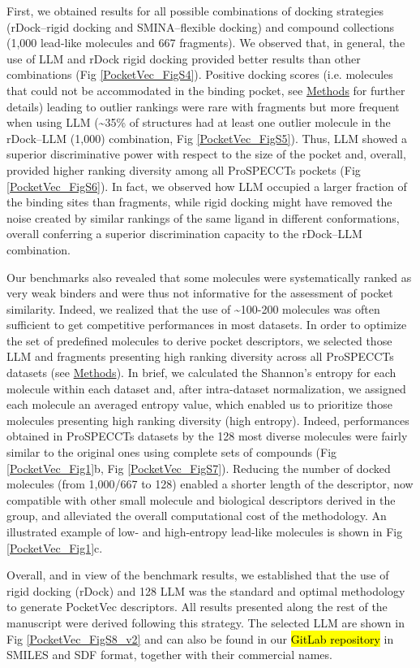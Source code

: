 First, we obtained results for all possible combinations of docking strategies (rDock--rigid docking and SMINA--flexible docking) and compound collections (1,000 lead-like molecules and 667 fragments). We observed that, in general, the use of LLM and rDock rigid docking provided better results than other combinations (Fig \ref{PocketVec_FigS4}). Positive docking scores (i.e. molecules that could not be accommodated in the binding pocket, see \hyperref[PocketVec_Methods]{Methods} for further details) leading to outlier rankings were rare with fragments but more frequent when using LLM (\textasciitilde35\% of structures had at least one outlier molecule in the rDock--LLM (1,000) combination, Fig \ref{PocketVec_FigS5}). Thus, LLM showed a superior discriminative power with respect to the size of the pocket and, overall, provided higher ranking diversity among all ProSPECCTs pockets (Fig \ref{PocketVec_FigS6}). In fact, we observed how LLM occupied a larger fraction of the binding sites than fragments, while rigid docking might have removed the noise created by similar rankings of the same ligand in different conformations, overall conferring a superior discrimination capacity to the rDock--LLM combination.

Our benchmarks also revealed that some molecules were systematically ranked as very weak binders and were thus not informative for the assessment of pocket similarity. Indeed, we realized that the use of \textasciitilde100-200 molecules was often sufficient to get competitive performances in most datasets. In order to optimize the set of predefined molecules to derive pocket descriptors, we selected those LLM and fragments presenting high ranking diversity across all ProSPECCTs datasets (see \hyperref[PocketVec_Methods]{Methods}). In brief, we calculated the Shannon’s entropy for each molecule within each dataset and, after intra-dataset normalization, we assigned each molecule an averaged entropy value, which enabled us to prioritize those molecules presenting high ranking diversity (high entropy). Indeed, performances obtained in ProSPECCTs datasets by the 128 most diverse molecules were fairly similar to the original ones using complete sets of compounds (Fig \ref{PocketVec_Fig1}b, Fig \ref{PocketVec_FigS7}). Reducing the number of docked molecules (from 1,000/667 to 128) enabled a shorter length of the descriptor, now compatible with other small molecule and biological descriptors derived in the group\cite{fernandez-torras_integrating_2022, duran-frigola_extending_2020, bertoni_bioactivity_2021}, and alleviated the overall computational cost of the methodology. An illustrated example of low- and high-entropy lead-like molecules is shown in Fig \ref{PocketVec_Fig1}c.

Overall, and in view of the benchmark results, we established that the use of rigid docking (rDock) and 128 LLM was the standard and optimal methodology to generate PocketVec descriptors. All results presented along the rest of the manuscript were derived following this strategy. The selected LLM are shown in Fig \ref{PocketVec_FigS8_v2} and can also be found in our \hl{GitLab repository} in SMILES and SDF format, together with their commercial names. 